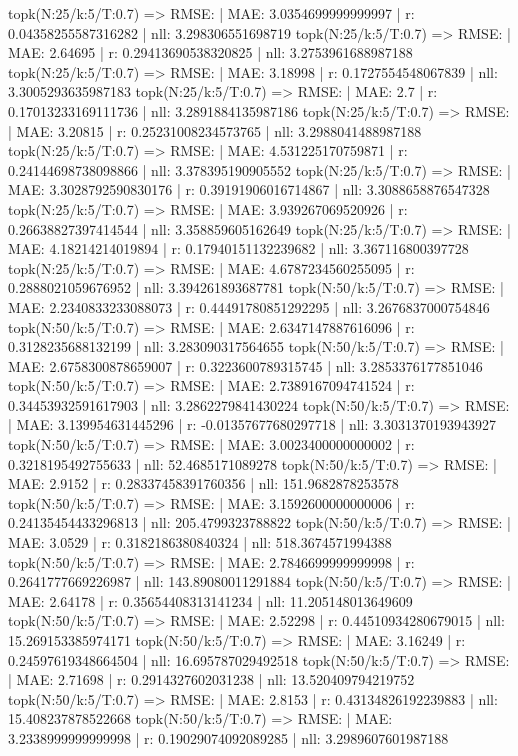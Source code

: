 topk(N:25/k:5/T:0.7) => RMSE: | MAE: 3.0354699999999997 | r: 0.04358255587316282 | nll: 3.298306551698719
topk(N:25/k:5/T:0.7) => RMSE: | MAE: 2.64695 | r: 0.29413690538320825 | nll: 3.2753961688987188
topk(N:25/k:5/T:0.7) => RMSE: | MAE: 3.18998 | r: 0.1727554548067839 | nll: 3.3005293635987183
topk(N:25/k:5/T:0.7) => RMSE: | MAE: 2.7 | r: 0.17013233169111736 | nll: 3.2891884135987186
topk(N:25/k:5/T:0.7) => RMSE: | MAE: 3.20815 | r: 0.25231008234573765 | nll: 3.2988041488987188
topk(N:25/k:5/T:0.7) => RMSE: | MAE: 4.531225170759871 | r: 0.24144698738098866 | nll: 3.378395190905552
topk(N:25/k:5/T:0.7) => RMSE: | MAE: 3.3028792590830176 | r: 0.39191906016714867 | nll: 3.3088658876547328
topk(N:25/k:5/T:0.7) => RMSE: | MAE: 3.939267069520926 | r: 0.26638827397414544 | nll: 3.358859605162649
topk(N:25/k:5/T:0.7) => RMSE: | MAE: 4.18214214019894 | r: 0.17940151132239682 | nll: 3.367116800397728
topk(N:25/k:5/T:0.7) => RMSE: | MAE: 4.6787234560255095 | r: 0.2888021059676952 | nll: 3.394261893687781
topk(N:50/k:5/T:0.7) => RMSE: | MAE: 2.2340833233088073 | r: 0.44491780851292295 | nll: 3.2676837000754846
topk(N:50/k:5/T:0.7) => RMSE: | MAE: 2.6347147887616096 | r: 0.3128235688132199 | nll: 3.283090317564655
topk(N:50/k:5/T:0.7) => RMSE: | MAE: 2.6758300878659007 | r: 0.3223600789315745 | nll: 3.2853376177851046
topk(N:50/k:5/T:0.7) => RMSE: | MAE: 2.7389167094741524 | r: 0.34453932591617903 | nll: 3.2862279841430224
topk(N:50/k:5/T:0.7) => RMSE: | MAE: 3.139954631445296 | r: -0.01357677680297718 | nll: 3.3031370193943927
topk(N:50/k:5/T:0.7) => RMSE: | MAE: 3.0023400000000002 | r: 0.3218195492755633 | nll: 52.4685171089278
topk(N:50/k:5/T:0.7) => RMSE: | MAE: 2.9152 | r: 0.28337458391760356 | nll: 151.9682878253578
topk(N:50/k:5/T:0.7) => RMSE: | MAE: 3.1592600000000006 | r: 0.24135454433296813 | nll: 205.4799323788822
topk(N:50/k:5/T:0.7) => RMSE: | MAE: 3.0529 | r: 0.3182186380840324 | nll: 518.3674571994388
topk(N:50/k:5/T:0.7) => RMSE: | MAE: 2.7846699999999998 | r: 0.2641777669226987 | nll: 143.89080011291884
topk(N:50/k:5/T:0.7) => RMSE: | MAE: 2.64178 | r: 0.35654408313141234 | nll: 11.205148013649609
topk(N:50/k:5/T:0.7) => RMSE: | MAE: 2.52298 | r: 0.44510934280679015 | nll: 15.269153385974171
topk(N:50/k:5/T:0.7) => RMSE: | MAE: 3.16249 | r: 0.24597619348664504 | nll: 16.695787029492518
topk(N:50/k:5/T:0.7) => RMSE: | MAE: 2.71698 | r: 0.2914327602031238 | nll: 13.520409794219752
topk(N:50/k:5/T:0.7) => RMSE: | MAE: 2.8153 | r: 0.43134826192239883 | nll: 15.408237878522668
topk(N:50/k:5/T:0.7) => RMSE: | MAE: 3.2338999999999998 | r: 0.19029074092089285 | nll: 3.2989607601987188
